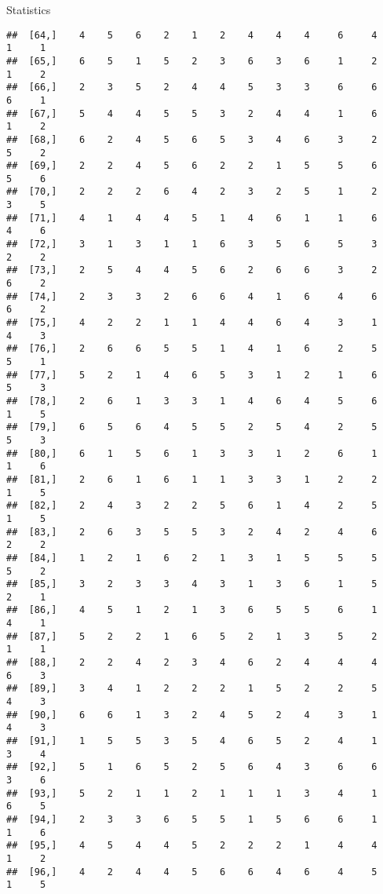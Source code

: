 \documentclass[
  ignorenonframetext,
]{beamer}
\begin{document}
\begin{frame}[fragile]{Statistics}
\begin{verbatim}
##  [64,]    4    5    6    2    1    2    4    4    4     6     4     1     1
##  [65,]    6    5    1    5    2    3    6    3    6     1     2     1     2
##  [66,]    2    3    5    2    4    4    5    3    3     6     6     6     1
##  [67,]    5    4    4    5    5    3    2    4    4     1     6     1     2
##  [68,]    6    2    4    5    6    5    3    4    6     3     2     5     2
##  [69,]    2    2    4    5    6    2    2    1    5     5     6     5     6
##  [70,]    2    2    2    6    4    2    3    2    5     1     2     3     5
##  [71,]    4    1    4    4    5    1    4    6    1     1     6     4     6
##  [72,]    3    1    3    1    1    6    3    5    6     5     3     2     2
##  [73,]    2    5    4    4    5    6    2    6    6     3     2     6     2
##  [74,]    2    3    3    2    6    6    4    1    6     4     6     6     2
##  [75,]    4    2    2    1    1    4    4    6    4     3     1     4     3
##  [76,]    2    6    6    5    5    1    4    1    6     2     5     5     1
##  [77,]    5    2    1    4    6    5    3    1    2     1     6     5     3
##  [78,]    2    6    1    3    3    1    4    6    4     5     6     1     5
##  [79,]    6    5    6    4    5    5    2    5    4     2     5     5     3
##  [80,]    6    1    5    6    1    3    3    1    2     6     1     1     6
##  [81,]    2    6    1    6    1    1    3    3    1     2     2     1     5
##  [82,]    2    4    3    2    2    5    6    1    4     2     5     1     5
##  [83,]    2    6    3    5    5    3    2    4    2     4     6     2     2
##  [84,]    1    2    1    6    2    1    3    1    5     5     5     5     2
##  [85,]    3    2    3    3    4    3    1    3    6     1     5     2     1
##  [86,]    4    5    1    2    1    3    6    5    5     6     1     4     1
##  [87,]    5    2    2    1    6    5    2    1    3     5     2     1     1
##  [88,]    2    2    4    2    3    4    6    2    4     4     4     6     3
##  [89,]    3    4    1    2    2    2    1    5    2     2     5     4     3
##  [90,]    6    6    1    3    2    4    5    2    4     3     1     4     3
##  [91,]    1    5    5    3    5    4    6    5    2     4     1     3     4
##  [92,]    5    1    6    5    2    5    6    4    3     6     6     3     6
##  [93,]    5    2    1    1    2    1    1    1    3     4     1     6     5
##  [94,]    2    3    3    6    5    5    1    5    6     6     1     1     6
##  [95,]    4    5    4    4    5    2    2    2    1     4     4     1     2
##  [96,]    4    2    4    4    5    6    6    4    6     4     5     1     5

\end{verbatim}
\end{frame}
\end{document}

